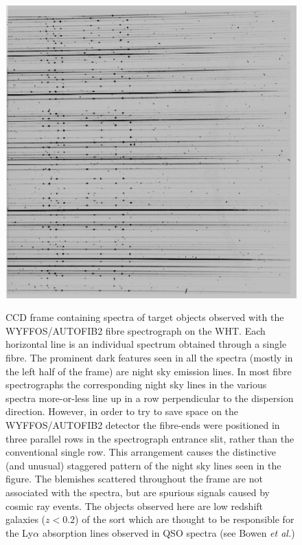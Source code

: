 \documentclass[twoside,11pt]{article}
\begin{document}
\begin{figure}[htbp]
   \centering 
   \includegraphics[totalheight=5in]{sc14_objframe.ps}
   \begin{quote}
   \caption[CCD frame of target object spectra acquired with 
    WYFFOS/AUTOFIB2]{CCD frame containing spectra of target objects
    observed with the WYFFOS/AUTOFIB2 fibre spectrograph on the WHT.
    Each horizontal line is an individual spectrum obtained through a
    single fibre.  The prominent dark features seen in all the spectra
    (mostly in the left half of the frame) are night sky emission lines.
    In most fibre spectrographs the corresponding night sky lines in the
    various spectra more-or-less line up in a row perpendicular to the
    dispersion direction.  However, in order to try to save space on the
    WYFFOS/AUTOFIB2 detector the fibre-ends were positioned in three
    parallel rows in the spectrograph entrance slit, rather than the
    conventional single row.  This arrangement causes the distinctive (and
    unusual) staggered pattern of the night sky lines seen in the figure.
    The blemishes scattered throughout the frame are not associated with
    the spectra, but are spurious signals caused by cosmic ray events.
    The objects observed here are low redshift galaxies ($z < 0.2$\/) of
    the sort which are thought to be responsible for the Ly$\alpha$
    absorption lines observed in QSO spectra (see Bowen {\it et
    al.}\/\cite{BOWEN98})
   \label{OBJFRAME} }
   \end{quote}
\end{figure}
\end{document}
